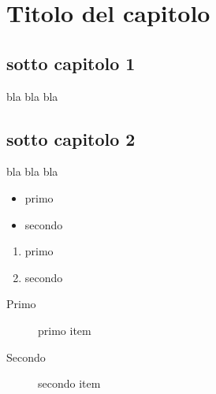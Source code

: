 
\section{Titolo del capitolo}{
	\subsection{sotto capitolo 1}{
		bla bla bla	 }
	\subsection{sotto capitolo 2}{ 
		bla bla bla	}
}

\textbf{} %
\uppercase{} %
\emph{} %

\tiny{} 
\small{}
\normalsize{}
\large{}
\Large{}
\huge{}
\Huge{}

\begin{itemize}
	\item primo
	\item secondo
\end{itemize}
\begin{enumerate}
	\item primo
	\item secondo
\end{enumerate}
\begin{description}
	\item[Primo] \hfill  primo item %
	\item[Secondo] secondo item
\end{description}

